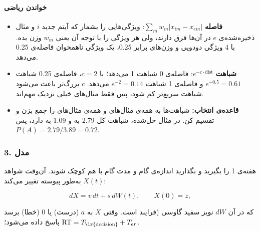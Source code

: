 \paragraph{خواندن ریاضی}

\begin{itemize}
\tightlist
\item
  \textbf{فاصله} \(\sum_m w_m|x_{im} - x_{em}|\): ویژگی‌هایی را بشمار که
  آیتم جدید \(i\) و مثال ذخیره‌شده‌ی \(e\) در آن‌ها فرق دارند، ولی هر ویژگی
  را با توجه آن یعنی \(w_m\) وزن بده. با 4 ویژگی دودویی و وزن‌های برابر
  0.25، یک ویژگی ناهمخوان فاصله‌ی 0.25 می‌دهد.
\item
  \textbf{شباهت} \(e^{-c \cdot \mathrm{dist}}\): فاصله‌ی 0 شباهت 1 می‌دهد؛
  با \(c = 2\)، فاصله‌ی 0.25 شباهت \(e^{-0.5} = 0.61\) و فاصله‌ی 1 شباهت
  \(e^{-2} = 0.14\) می‌دهد. \(c\) بزرگ‌تر باعث می‌شود شباهت سریع‌تر کم شود،
  پس فقط مثال‌های خیلی نزدیک مهم‌اند.
\item
  \textbf{قاعده‌ی انتخاب:} شباهت‌ها به همه‌ی مثال‌های  و همه‌ی مثال‌های
   را جمع بزن و تقسیم کن. در مثال حل‌شده،  شباهت کل 2.79 به
   و 1.09 به  دارد، پس \(P(A) = 2.79/3.89 = 0.72\).
\end{itemize}

\subsubsection{\texorpdfstring{3. مدل }{3. مدل drift-diffusion (DDM)}}

 هفته‌ی 1 را بگیرید و بگذارید اندازه‌ی گام و مدت گام با هم
کوچک شوند. آن‌وقت شواهد \(X(t)\) به‌طور پیوسته تغییر می‌کند:

\[
dX = v\,dt + s\,dW(t), \qquad X(0) = z,
\]

که در آن \(dW\) نویز سفید گاوسی (فرایند  است. وقتی \(X\) به
\(a\) (درست) یا \(0\) (خطا) برسد پاسخ داده می‌شود؛
\(\mathrm{RT} = T_{\text{\lr{decision}}} + T_{er}\).

